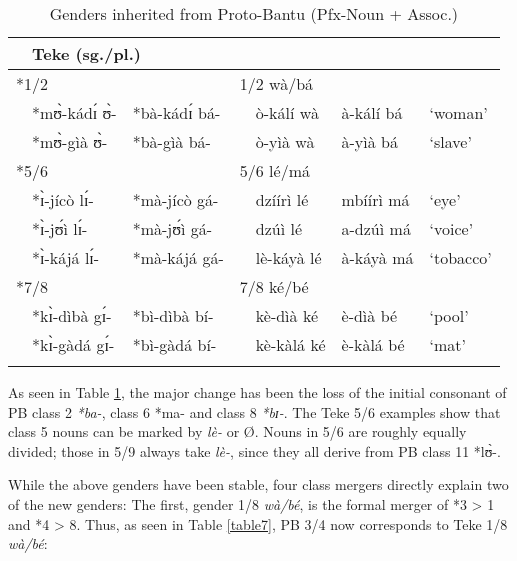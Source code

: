 \documentclass[output=paper,,modfonts,nonflat]{langsci/langscibook-Hyman-et-al}
\begin{document}
\begin{table}[!htbp]
\caption{Genders inherited from Proto-Bantu (Pfx-Noun + Assoc.)}
\label{table6}
\begin{small}
\begin{tabular}{l		l l l  		l		l		l}
  \lsptoprule
\multicolumn{3}{l}{PB (sg./pl.)}					&	\multicolumn{2}{l}{Teke (sg./pl.)}					&		\\	
\midrule
\multicolumn{2}{l}{*1/2}			&		&	\multicolumn{2}{l}{1/2 wà/bá}			&		&		\\	
	&	*mʊ̀-kádɪ́ ʊ̀-	&	*bà-kádɪ́ bá-	&		&	ò-kálí wà	&	à-kálí bá	&	`woman’	\\	
	&	*mʊ̀-gìà ʊ̀-	&	*bà-gìà bá-	&		&	ò-yìà wà	&	à-yìà bá	&	`slave’	\\	[0.2cm]
\multicolumn{2}{l}{*5/6}			&		&	\multicolumn{2}{l}{5/6 lé/má}			&		&		\\	
	&	*ɪ̀-jícò lɪ́-	&	*mà-jícò gá-	&		&	dzíírì lé	&	mbíírì má	&	`eye’	\\	
	&	*ɪ̀-jʊ́ì lɪ́-	&	*mà-jʊ́ì gá-	&		&	dzúì lé	&	a-dzúì má	&	`voice’	\\	
	&	*ɪ̀-kájá lɪ́-	&	*mà-kájá gá-	&		&	lè-káyà lé	&	à-káyà má	&	`tobacco’	\\	[0.2cm]
\multicolumn{2}{l}{*7/8}			&		&	\multicolumn{2}{l}{7/8 ké/bé}			&		&		\\	
	&	*kɪ̀-dìbà gɪ́-	&	*bì-dìbà bí-	&		&	kè-dìà ké	&	è-dìà bé	&	`pool’	\\	
	&	*kɪ̀-gàdá gɪ́-	&	*bì-gàdá bí-	&		&	kè-kàlá ké	&	è-kàlá bé	&	`mat’	\\	
  \lspbottomrule
\end{tabular}
\end{small}
\end{table}

As seen in Table \ref{table6}, the major change has been the loss of the initial consonant of PB class 2 \textit{*ba-}, class 6 *ma- and class 8 \textit{*bɪ-}. The Teke 5/6 examples show that class 5 nouns can be marked by \textit{lè-} or Ø. Nouns in 5/6 are roughly equally divided; those in 5/9 always take \textit{lè-}, since they all derive from PB class 11 *lʊ̀-.

While the above genders have been stable, four class mergers directly explain two of the new genders: The first, gender 1/8 \textit{wà/bé}, is the formal merger of *3 > 1 and *4 > 8. Thus, as seen in Table \ref{table7}, PB 3/4 now corresponds to Teke 1/8 \textit{wà/bé}:
\end{document}
